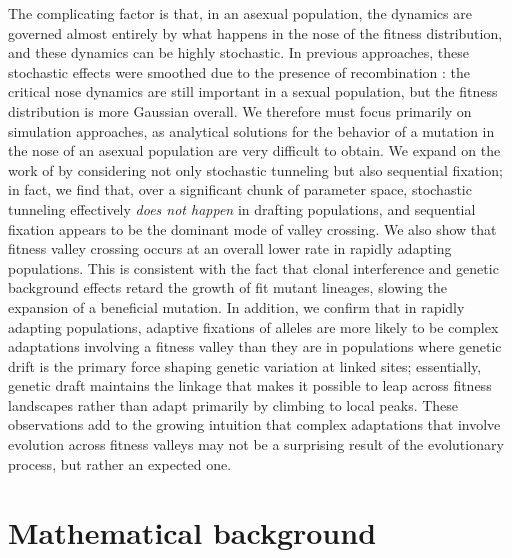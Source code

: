 \documentclass[10pt,twocolumn,twoside]{gsajnl}
\begin{document}
\begin{spacing}{1.5}
The complicating factor is that, in an asexual population, the dynamics are governed almost entirely by what happens in the nose of the fitness distribution, and these dynamics can be highly stochastic.
In previous approaches, these stochastic effects were smoothed due to the presence of recombination \citep{neher_shraiman_2011, neher_shraiman_2009}: the critical nose dynamics are still important in a sexual population, but the fitness distribution is more Gaussian overall.
We therefore must focus primarily on simulation approaches, as analytical solutions for the behavior of a mutation in the nose of an asexual population are very difficult to obtain.
We expand on the work of \citet{neher_shraiman_2011} by considering not only stochastic tunneling but also sequential fixation; in fact, we find that, over a significant chunk of parameter space, stochastic tunneling effectively \emph{does not happen} in drafting populations, and sequential fixation appears to be the dominant mode of valley crossing.
We also show that fitness valley crossing occurs at an overall lower rate in rapidly adapting populations.
This is consistent with the fact that clonal interference and genetic background effects retard the growth of fit mutant lineages, slowing the expansion of a beneficial mutation.
In addition, we confirm that in rapidly adapting populations, adaptive fixations of alleles are more likely to be complex adaptations involving a fitness valley than they are in populations where genetic drift is the primary force shaping genetic variation at linked sites; essentially, genetic draft maintains the linkage that makes it possible to leap across fitness landscapes rather than adapt primarily by climbing to local peaks.
These observations add to the growing intuition that complex adaptations that involve evolution across fitness valleys may not be a surprising result of the evolutionary process, but rather an expected one.

\section{Mathematical background}


\end{spacing}
\end{document}
